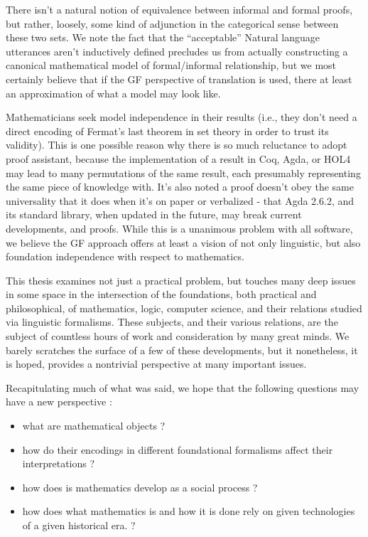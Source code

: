 There isn't a natural notion of equivalence between informal and formal proofs,
but rather, loosely, some kind of adjunction in the categorical sense between
these two sets. We note the fact that the ``acceptable'' Natural language
utterances aren't inductively defined precludes us from actually constructing a
canonical mathematical model of formal/informal relationship, but we most certainly
believe that if the GF perspective of translation is used, there at least an
approximation of what a model may look like.


Mathematicians seek model independence in their results (i.e., they don't need a
direct encoding of Fermat's last theorem in set theory in order to trust its
validity). This is one possible reason why there is so much reluctance to adopt
proof assistant, because the implementation of a result in Coq, Agda, or HOL4
may lead to many permutations of the same result, each presumably representing
the same piece of knowledge with. It's also noted a proof doesn't obey the same
universality that it does when it's on paper or verbalized - that Agda 2.6.2,
and its standard library, when updated in the future, may break current
developments, and proofs. While this is a unanimous problem with all software,
we believe the GF approach offers at least a vision of not only linguistic, but
also foundation independence with respect to mathematics.

This thesis examines not just a practical problem, but touches many deep issues in
some space in the intersection of the foundations, both practical and
philosophical, of mathematics, logic, computer science, and their relations
studied via linguistic formalisms. These subjects, and their various relations,
are the subject of countless hours of work and consideration by many great
minds. We barely scratches the surface of a few of these developments,
but it nonetheless, it is hoped, provides a nontrivial perspective at many
important issues.

Recapitulating much of what was said, we hope that the following questions may
have a new perspective :

\begin{itemize}

\item what are mathematical objects ?
\item how do their encodings in different foundational formalisms affect their
  interpretations ?
\item how does is mathematics develop as a social process ?
\item how does what mathematics is and how it is done rely on given technologies
  of a given historical era. ?
  
\end{itemize}

